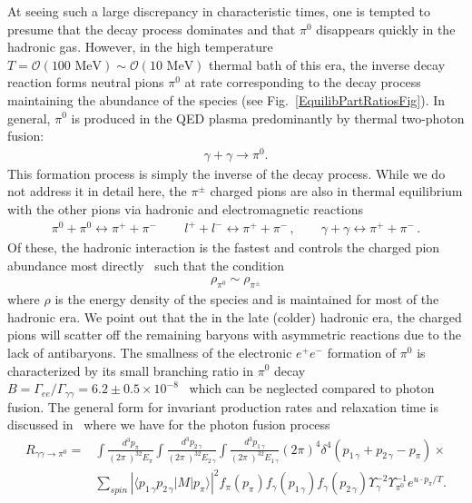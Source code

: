 \documentclass[universe,article,submit,moreauthors,pdftex,a4paper]{Definitions/mdpi}
\newcommand{\MeV}{\text{ MeV}}
\newcommand*{\rf}[1]{Fig.~{\ref{#1}}}
\begin{document}
At seeing such a large discrepancy in characteristic times, one is tempted to presume that the decay process dominates and that $\pi^0$ disappears quickly in the hadronic gas. However, in the high temperature $T=\mathcal{O}(100\MeV)\sim\mathcal{O}(10\MeV)$ thermal bath of this era, the inverse decay reaction forms neutral pions $\pi^0$ at rate corresponding to the decay process maintaining the abundance of the species (see \rf{EquilibPartRatiosFig}). In general, $\pi^0$ is produced in the QED plasma predominantly by thermal two-photon fusion:
\begin{align}
\gamma+\gamma \rightarrow \pi^{0}. 
\end{align}
This formation process is simply the inverse of the decay process. While we do not address it in detail here, the $\pi^{\pm}$ charged pions are also in thermal equilibrium with the other pions via hadronic and electromagnetic reactions
\begin{align}
    \pi^{0}+\pi^{0}\leftrightarrow\pi^{+}+\pi^{-}\,\qquad l^{+}+l^{-}\leftrightarrow\pi^{+}+\pi^{-}\,,\qquad\gamma+\gamma\leftrightarrow\pi^{+}+\pi^{-}\,.
\end{align}
Of these, the hadronic interaction is the fastest and controls the charged pion abundance most directly~\cite{Kuznetsova:2009xh,Fromerth:2012fe} such that the condition
\begin{align}
    \rho_{\pi^{0}}\sim\rho_{\pi^{\pm}}
\end{align}
where $\rho$ is the energy density of the species and is maintained for most of the hadronic era. We point out that the in the late (colder) hadronic era, the charged pions will scatter off the remaining baryons with asymmetric reactions due to the lack of antibaryons. The smallness of the electronic $e^{+}e^{-}$ formation of $\pi^0$ is characterized by its small branching ratio in $\pi^0$ decay $B=\Gamma_{ee}/\Gamma_{\gamma\gamma}=6.2\pm 0.5\times10^{-8}$~\cite{ParticleDataGroup:2018ovx} which can be neglected compared to photon fusion. The general form for invariant production rates and relaxation time is discussed in~\cite{Kuznetsova:2008jt} where we have for the photon fusion process
\begin{align}
R_{\gamma\gamma\to\pi^0}=&\int\frac{d^{3}{p_{\pi}}}{(2\pi\ )^32E_{\pi}}
 \int\frac{d^{3} {p_{2\,\gamma}}}{(2\pi\ )^32E_{2\,\gamma}}
 \int\frac{d^{3}{p_{1\,\gamma}}} {(2\pi\ )^32E_{1\,\gamma} }\left(2\pi\right)^{4}
 \delta^{4}\left(p_{1\,\gamma}+p_{2\,\gamma}-p_{\pi}\right)\times \nonumber\\ &
 \sum_{spin}\left|\langle p_{1\,\gamma}p_{2\,\gamma}\left| M\right|p_{\pi}\rangle\right|^{2}
 f_{\pi}(p_{\pi})f_{\gamma}(p_{1\,\gamma})f_{\gamma}(p_{2\,\gamma})
 \Upsilon^{-2}_{\gamma}\Upsilon_{\pi^{0}}^{-1}e^{u \cdot p_{\pi}/T}. \label{pi0pr}
 \end{align}
\end{document}

